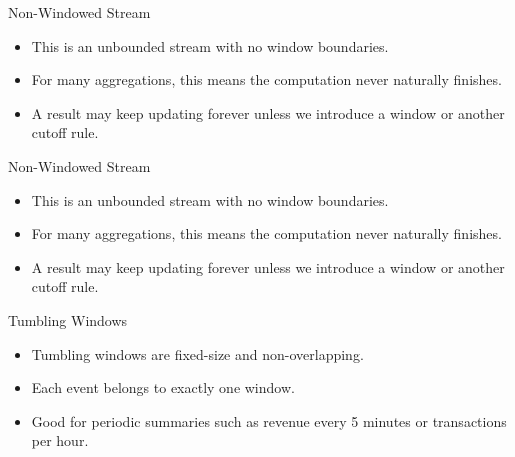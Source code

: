 \documentclass[aspectratio=169]{beamer}
\begin{document}
\begin{frame}{Non-Windowed Stream}
\begin{center}

\end{center}

\vspace{0.2cm}
\begin{itemize}
    \item This is an unbounded stream with no window boundaries.
    \item For many aggregations, this means the computation never naturally finishes.
    \item A result may keep updating forever unless we introduce a window or another cutoff rule.
\end{itemize}
\end{frame}

\begin{frame}{Non-Windowed Stream}
\begin{center}

\end{center}

\vspace{0.2cm}
\begin{itemize}
    \item This is an unbounded stream with no window boundaries.
    \item For many aggregations, this means the computation never naturally finishes.
    \item A result may keep updating forever unless we introduce a window or another cutoff rule.
\end{itemize}
\end{frame}

\begin{frame}{Tumbling Windows}
\begin{center}

\end{center}

\vspace{0.2cm}
\begin{itemize}
    \item Tumbling windows are fixed-size and non-overlapping.
    \item Each event belongs to exactly one window.
    \item Good for periodic summaries such as revenue every 5 minutes or transactions per hour.
\end{itemize}
\end{frame}
\end{document}
